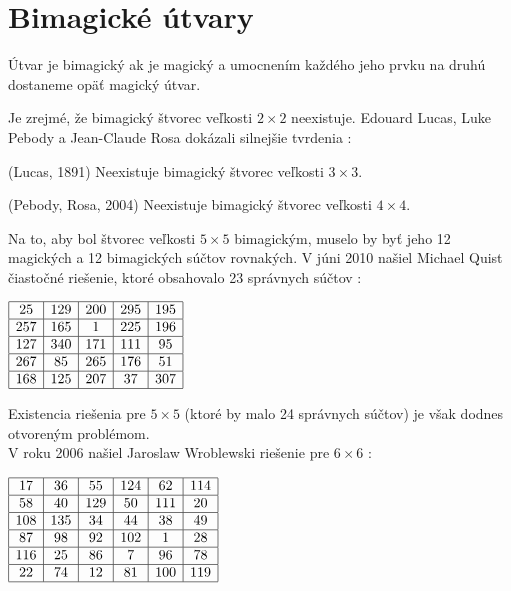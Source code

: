 \section{Bimagické útvary}
\begin{definition} Útvar je bimagický ak je magický a umocnením každého jeho prvku na druhú dostaneme opäť magický útvar.
\end{definition}

Je zrejmé, že bimagický štvorec veľkosti $2 \times 2$ neexistuje. Edouard Lucas, Luke Pebody a Jean-Claude Rosa dokázali silnejšie tvrdenia \cite{multimagie}:

\begin{theorem} (Lucas, 1891) Neexistuje bimagický štvorec veľkosti $3 \times 3$.
\end{theorem}

\begin{theorem} (Pebody, Rosa, 2004) Neexistuje bimagický štvorec veľkosti $4 \times 4$.
\end{theorem}

Na to, aby bol štvorec veľkosti $5 \times 5$ bimagickým, muselo by byť jeho 12 magických a 12 bimagických súčtov rovnakých. V júni 2010 našiel Michael Quist čiastočné riešenie, ktoré obsahovalo 23 správnych súčtov \cite{multimagie}:

\begin{center}
$\begin{array}{ |c|c|c|c|c| }
\hline
25 & 129 & 200 & 295 & 195 \\ 
\hline
257 & 165 & 1 & 225 & 196  \\ 
\hline
127 & 340 & 171 & 111 & 95 \\ 
\hline
267 & 85 & 265 & 176 & 51 \\ 
\hline
168 & 125 & 207 & 37 & 307 \\
\hline
\end{array}$
\end{center}

Existencia riešenia pre $5 \times 5$ (ktoré by malo 24 správnych súčtov) je však dodnes otvoreným problémom. \\

V roku 2006 našiel Jaroslaw Wroblewski riešenie pre $6 \times 6$ \cite{multimagie}:

\begin{center}
$\begin{array}{ |c|c|c|c|c|c| } 
\hline
17 & 36 & 55 & 124 & 62 & 114 \\ 
\hline
58 & 40 & 129 & 50 & 111 & 20 \\ 
\hline
108 & 135 & 34 & 44 & 38 & 49 \\
\hline
87 & 98 & 92 & 102 & 1 & 28 \\
\hline
116 & 25 & 86 & 7 & 96 & 78 \\
\hline
22 & 74 & 12 & 81 & 100 & 119 \\
\hline
\end{array}$
\end{center}

